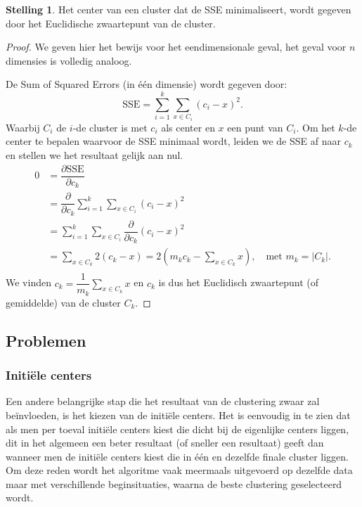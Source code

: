 \documentclass[a4paper,12pt]{article}
\theoremstyle{definition}
\newtheorem{st}{Stelling}[subsection]
\newcommand{\SSE}{\text{SSE}}
\begin{document}
\begin{st}
 Het center van een cluster dat de SSE minimaliseert, wordt gegeven door
 het Euclidische zwaartepunt van de cluster.
\end{st}

\begin{proof}
 We geven hier het bewijs voor het eendimensionale geval, het geval voor $n$ dimensies is volledig
 analoog.
 
 De Sum of Squared Errors (in één dimensie) wordt gegeven door:
 $$\SSE=\sum\limits_{i=1}^k\sum\limits_{x\in C_i}(c_i - x)^2.$$
 Waarbij $C_i$ de $i$-de cluster is met $c_i$ als center en $x$ een punt van
 $C_i$. Om het $k$-de center te bepalen waarvoor de SSE minimaal wordt,
 leiden we de SSE af naar $c_k$ en stellen we het resultaat gelijk aan nul.
 \begin{align*}
  0 &=  \dfrac{\partial \SSE}{\partial c_k}\\
  &= \dfrac{\partial}{\partial c_k}
  \sum\limits_{i=1}^k\sum\limits_{x\in C_i}(c_i - x)^2\\
  &= \sum\limits_{i=1}^k\sum\limits_{x\in C_i}\dfrac{\partial}{\partial c_k}
  (c_i - x)^2\\
  &= \sum\limits_{x\in C_k}2(c_k - x) = 
  2\left(m_kc_k-\sum\limits_{x\in C_k}x\right), \quad \text{met } m_k = |C_k|.\\
 \end{align*}
We vinden $c_k =
\dfrac{1}{m_k}\sum\limits_{x\in C_k}x$ en $c_k$ is dus het Euclidisch zwaartepunt
(of gemiddelde) van de cluster $C_k$.
\end{proof}


\subsection{Problemen}

\subsubsection{Initiële centers}
Een andere belangrijke stap die het resultaat van de clustering zwaar zal 
beïnvloeden, is het kiezen van de initiële centers. Het is eenvoudig in 
te zien dat als men per toeval initiële centers kiest die dicht bij de eigenlijke 
centers liggen, dit in het algemeen een beter resultaat (of sneller een resultaat)
geeft dan wanneer men de initiële centers kiest die in één en dezelfde
finale cluster liggen. 
Om deze reden wordt het algoritme vaak meermaals uitgevoerd op dezelfde data maar 
met verschillende beginsituaties, waarna de beste clustering geselecteerd wordt.
\end{document}
